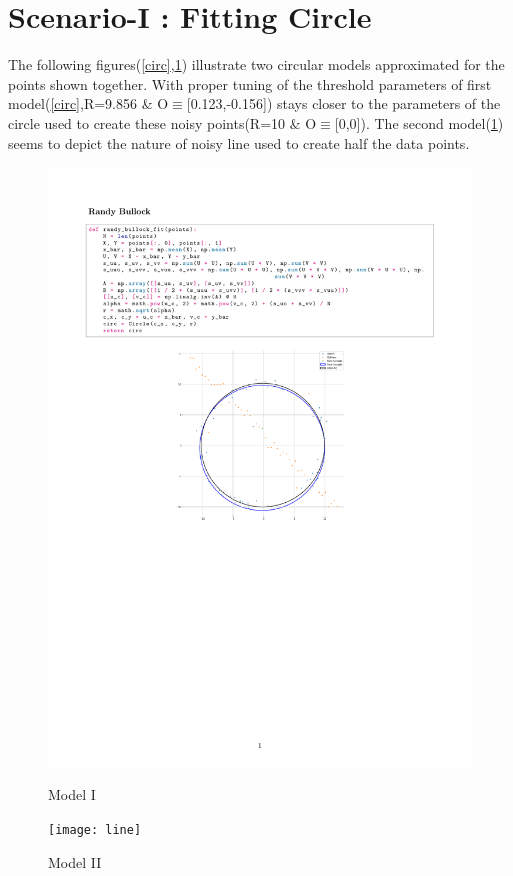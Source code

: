 \section*{Scenario-I : Fitting Circle}
\vspace*{-.2cm}
The following figures(\ref{circ},\ref{line}) illustrate two circular models approximated for the points shown together. With proper tuning of the threshold parameters of first model(\ref{circ},R=9.856 \& O$\equiv$[0.123,-0.156]) stays closer to the parameters of the circle used to create these noisy points(R=10 \& O$\equiv$[0,0]). The second model(\ref{line}) seems to depict the nature of noisy line used to create half the data points.
\begin{figure}[h]
    \begin{minipage}{.48\textwidth}
        \begin{center}
            \includegraphics[width=.75\columnwidth]{circle}
            \caption{Model I}
            \label{circ}
        \end{center}
    \end{minipage}
    \begin{minipage}{.48\textwidth}
        \begin{center}
            \texttt{[image: line]}
            \caption{Model II}
            \label{line}
        \end{center}
    \end{minipage}
\end{figure}
\newpage
